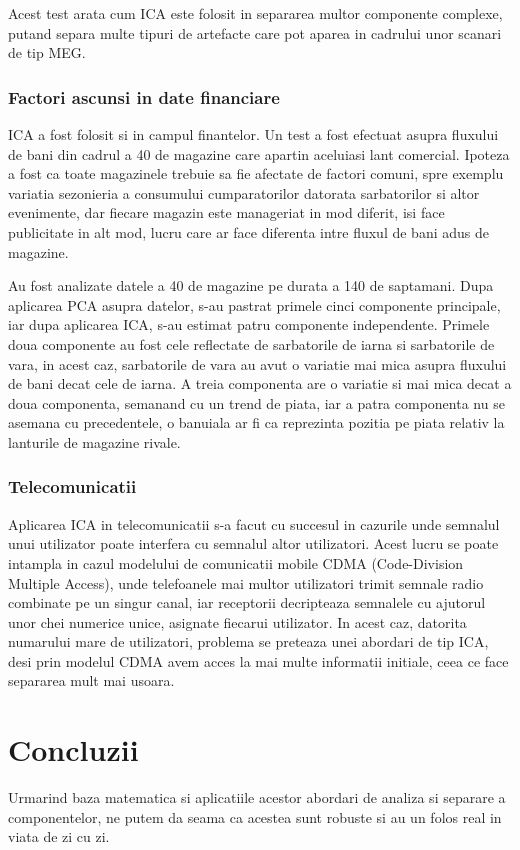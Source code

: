 \documentclass[12pt,oneside]{article}
\begin{document}
 Acest test arata cum ICA este folosit in separarea multor componente complexe, putand separa multe tipuri de artefacte care pot aparea in cadrului unor scanari de tip MEG.\cite{hyvarien}

 \subsubsection{Factori ascunsi in date financiare}
 ICA a fost folosit si in campul finantelor. Un test a fost efectuat asupra fluxului de bani din cadrul a 40 de magazine care apartin aceluiasi lant comercial. Ipoteza a fost ca toate magazinele trebuie sa fie afectate de factori comuni, spre exemplu variatia sezonieria a consumului cumparatorilor datorata sarbatorilor si altor evenimente, dar fiecare magazin este manageriat in mod diferit, isi face publicitate in alt mod, lucru care ar face diferenta intre fluxul de bani adus de magazine. 

 Au fost analizate datele a 40 de magazine pe durata a 140 de saptamani. Dupa aplicarea PCA asupra datelor, s-au pastrat primele cinci componente principale, iar dupa aplicarea ICA, s-au estimat patru componente independente. Primele doua componente au fost cele reflectate de sarbatorile de iarna si sarbatorile de vara, in acest caz, sarbatorile de vara au avut o variatie mai mica asupra fluxului de bani decat cele de iarna. A treia componenta are o variatie si mai mica decat a doua componenta, semanand cu un trend de piata, iar a patra componenta nu se asemana cu precedentele, o banuiala ar fi ca reprezinta pozitia pe piata relativ la lanturile de magazine rivale.\cite{hyvarien}

 \subsubsection{Telecomunicatii}
Aplicarea ICA in telecomunicatii s-a facut cu succesul in cazurile unde semnalul unui utilizator poate interfera cu semnalul altor utilizatori. Acest lucru se poate intampla in cazul modelului de comunicatii mobile CDMA (Code-Division Multiple Access), unde telefoanele mai multor utilizatori trimit semnale radio combinate pe un singur canal, iar receptorii decripteaza semnalele cu ajutorul unor chei numerice unice, asignate fiecarui utilizator. In acest caz, datorita numarului mare de utilizatori, problema se preteaza unei abordari de tip ICA, desi prin modelul CDMA avem acces la mai multe informatii initiale, ceea ce face separarea mult mai usoara.\cite{hyvarien}
\newpage
\section{Concluzii}
Urmarind baza matematica si aplicatiile acestor abordari de analiza si separare a componentelor, ne putem da seama ca acestea sunt robuste si au un folos real in viata de zi cu zi. 
\end{document}
